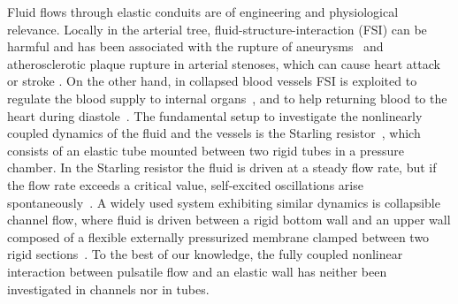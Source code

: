 \documentclass[aps,prl,reprint,superscriptaddress,floatfix]{revtex4-1}
\begin{document}
\maketitle

Fluid flows through elastic conduits are of engineering and physiological relevance. Locally in the arterial tree, fluid-structure-interaction (FSI) can be harmful and has been associated with the rupture of aneurysms~\cite{Han13} and atherosclerotic plaque rupture in arterial stenoses, which can cause heart attack or stroke \cite{Ku97}. On the other hand, in collapsed blood vessels FSI is exploited to regulate the blood supply to internal organs~\cite{Shapiro77}, and to help returning blood to the heart during diastole~\cite{Casey08}. The fundamental setup to investigate the nonlinearly coupled dynamics of the fluid and the vessels is the Starling resistor~\cite{Knowlton12}, which consists of an elastic tube mounted between two rigid tubes in a pressure chamber. In the Starling resistor the fluid is driven at a steady flow rate, but if the flow rate exceeds a critical value, self-excited oscillations arise spontaneously~\cite{Bertram08,Heil10,Stewart09}. A widely used system exhibiting similar dynamics is collapsible channel flow, where fluid is driven between a rigid bottom wall and an upper wall composed of a flexible externally pressurized membrane clamped between two rigid  sections~\cite{Jensen03,Heil11}. To the best of our knowledge, the fully coupled nonlinear interaction between pulsatile flow and an elastic wall has neither been investigated in channels nor in tubes.
\end{document}
